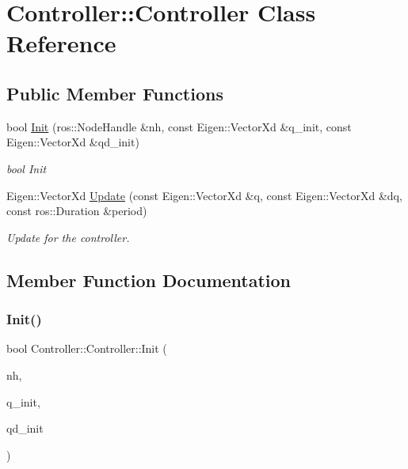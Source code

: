 \hypertarget{class_controller_1_1_controller}{}\section{Controller\+:\+:Controller Class Reference}
\label{class_controller_1_1_controller}
\subsection*{Public Member Functions}
\begin{DoxyCompactItemize}
\item 
bool \hyperlink{class_controller_1_1_controller_acbeee640daaeb54bd343e9463d75e0d3}{Init} (ros\+::\+Node\+Handle \&nh, const Eigen\+::\+Vector\+Xd \&q\+\_\+init, const Eigen\+::\+Vector\+Xd \&qd\+\_\+init)
\begin{DoxyCompactList}\small\item\em bool Init \end{DoxyCompactList}\item 
Eigen\+::\+Vector\+Xd \hyperlink{class_controller_1_1_controller_a533cbaf3f33f65ca265ae59093bd85c4}{Update} (const Eigen\+::\+Vector\+Xd \&q, const Eigen\+::\+Vector\+Xd \&dq, const ros\+::\+Duration \&period)
\begin{DoxyCompactList}\small\item\em Update for the controller. \end{DoxyCompactList}\end{DoxyCompactItemize}


\subsection{Member Function Documentation}
\mbox{\label{class_controller_1_1_controller_acbeee640daaeb54bd343e9463d75e0d3}} 
\subsubsection{\texorpdfstring{Init()}{Init()}}
{\footnotesize\ttfamily bool Controller\+::\+Controller\+::\+Init (\begin{DoxyParamCaption}\item[{ros\+::\+Node\+Handle \&}]{nh,  }\item[{const Eigen\+::\+Vector\+Xd \&}]{q\+\_\+init,  }\item[{const Eigen\+::\+Vector\+Xd \&}]{qd\+\_\+init }\end{DoxyParamCaption})}



